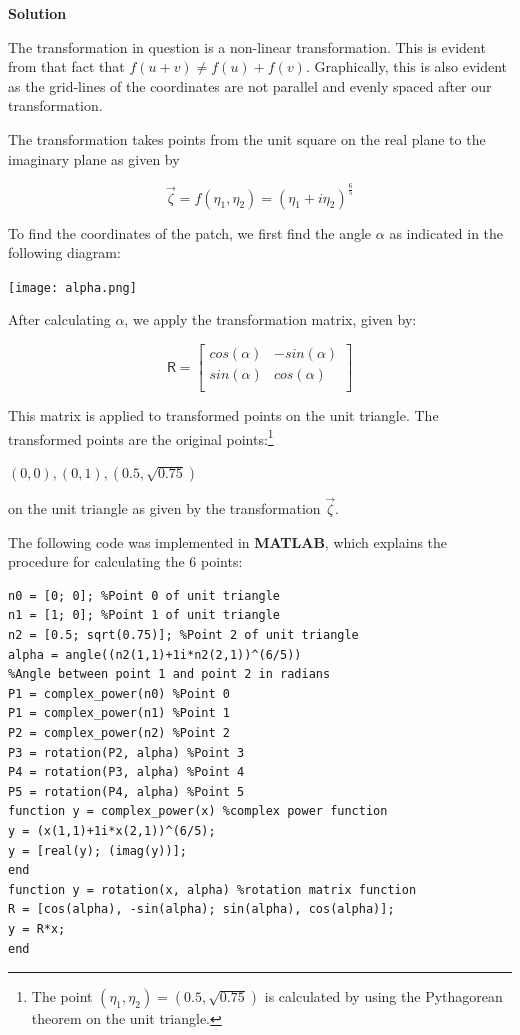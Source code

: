 \documentclass[a4paper, 11pt]{article}
\newcommand{\mat}[1]{\boldsymbol { \mathsf{#1}} }
\begin{document}
\begin{enumerate}
\begin{enumerate}[label=(\alph*)]
\textbf{Solution}

The transformation in question is a non-linear transformation. This is evident from that fact that \textbf{$f(u+v) \neq f(u) + f(v)$}. Graphically, this is also evident as the grid-lines of the coordinates are not parallel and evenly spaced after our transformation.

The transformation takes points from the unit square on the real plane to the imaginary plane as given by 

\begin{equation*}
    \vec \zeta = f(\eta_1, \eta_2) = (\eta_1 + i\eta_2)^{\frac{6}{5}}
\end{equation*}


To find the coordinates of the patch, we first find the angle $\alpha$ as indicated in the following diagram:

\begin{center}
  \texttt{[image: alpha.png]}
\end{center}

After calculating $\alpha$, we apply the transformation matrix, given by:

\begin{equation*}
\mat{R}=
\begin{bmatrix} 
       cos(\alpha) & -sin(\alpha)\\
       sin(\alpha) & cos(\alpha)\\
\end{bmatrix}   
\end{equation*}

This matrix is applied to transformed points on the unit triangle. The transformed points are the original points:\footnote{The point $(\eta_1, \eta_2) = (0.5, \sqrt{0.75})$ is calculated by using the Pythagorean theorem on the unit triangle.}
\begin{center}
$(0,0), (0,1),
(0.5, \sqrt{0.75})$
\end{center}
 on the unit triangle as given by the transformation $\vec \zeta$.

The following code was implemented in \textbf{MATLAB}, which explains the procedure for calculating the 6 points:

\begin{verbatim}
n0 = [0; 0]; %Point 0 of unit triangle
n1 = [1; 0]; %Point 1 of unit triangle
n2 = [0.5; sqrt(0.75)]; %Point 2 of unit triangle
alpha = angle((n2(1,1)+1i*n2(2,1))^(6/5))
%Angle between point 1 and point 2 in radians
P1 = complex_power(n0) %Point 0
P1 = complex_power(n1) %Point 1
P2 = complex_power(n2) %Point 2
P3 = rotation(P2, alpha) %Point 3
P4 = rotation(P3, alpha) %Point 4
P5 = rotation(P4, alpha) %Point 5
function y = complex_power(x) %complex power function
y = (x(1,1)+1i*x(2,1))^(6/5);
y = [real(y); (imag(y))];
end
function y = rotation(x, alpha) %rotation matrix function
R = [cos(alpha), -sin(alpha); sin(alpha), cos(alpha)];
y = R*x;
end
\end{verbatim}


\end{enumerate}
\end{enumerate}
\end{document}
